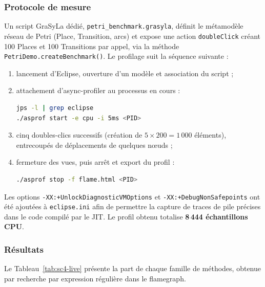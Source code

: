 \subsubsection{Protocole de mesure}

Un script GraSyLa dédié, \texttt{petri\_benchmark.grasyla}, définit le
métamodèle réseau de Petri (Place, Transition, arcs) et expose une action
\texttt{doubleClick} créant 100 Places et 100 Transitions par appel, via la
méthode \texttt{PetriDemo.createBenchmark()}. Le profilage suit la séquence
suivante :

\begin{enumerate}
  \item lancement d'Eclipse, ouverture d'un modèle et association du script ;
  \item attachement d'async-profiler au processus en cours :
\begin{lstlisting}[language=bash, caption={Attachement d'async-profiler au JVM Eclipse}, label={ls-asprof}]
jps -l | grep eclipse
./asprof start -e cpu -i 5ms <PID>
\end{lstlisting}
  \item cinq doubles-clics successifs (création de $5 \times 200 = 1\,000$
        éléments), entrecoupés de déplacements de quelques n\oe{}uds ;
  \item fermeture des vues, puis arrêt et export du profil :
\begin{lstlisting}[language=bash, caption={Arrêt du profilage et export du flamegraph}, label={ls-asprof-stop}]
./asprof stop -f flame.html <PID>
\end{lstlisting}
\end{enumerate}

Les options \texttt{-XX:+UnlockDiagnosticVMOptions} et
\texttt{-XX:+DebugNonSafepoints} ont été ajoutées à \texttt{eclipse.ini} afin de
permettre la capture de traces de pile précises dans le code compilé par le JIT.
Le profil obtenu totalise \textbf{8\,444 échantillons CPU}.

\subsubsection{Résultats}

Le Tableau~\ref{tab:sc4-live} présente la part de chaque famille de méthodes,
obtenue par recherche par expression régulière dans le flamegraph.


